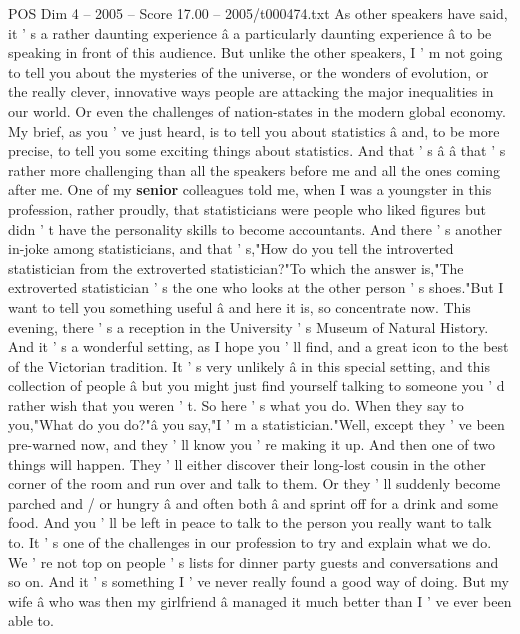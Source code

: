 \begin{textsample}{POS Dim 4 – 2005 – Score 17.00 – 2005/t000474.txt}  \label{ex:f4_pos_017}
As other speakers have said, it ' s a rather daunting experience â a particularly daunting experience â to be speaking in front of this audience.
But unlike the other speakers, I ' m not going to tell you about the mysteries of the universe, or the wonders of evolution, or the really clever, innovative ways people are attacking the major inequalities in our world.
Or even the challenges of nation-states in the modern global economy.
My brief, as you ' ve just heard, is to tell you about statistics â and, to be more precise, to tell you some exciting things about statistics.
And that ' s â â that ' s rather more challenging than all the speakers before me and all the ones coming after me.
One of my \textbf{senior} colleagues told me, when I was a youngster in this profession, rather proudly, that statisticians were people who liked figures but didn ' t have the personality skills to become accountants.
And there ' s another in-joke among statisticians, and that ' s,"How do you tell the introverted statistician from the extroverted statistician?"To which the answer is,"The extroverted statistician ' s the one who looks at the other person ' s shoes."But I want to tell you something useful â and here it is, so concentrate now.
This evening, there ' s a reception in the University ' s Museum of Natural History.
And it ' s a wonderful setting, as I hope you ' ll find, and a great icon to the best of the Victorian tradition.
It ' s very unlikely â in this special setting, and this collection of people â but you might just find yourself talking to someone you ' d rather wish that you weren ' t.
So here ' s what you do.
When they say to you,"What do you do?"â you say,"I ' m a statistician."Well, except they ' ve been pre-warned now, and they ' ll know you ' re making it up.
And then one of two things will happen.
They ' ll either discover their long-lost cousin in the other corner of the room and run over and talk to them.
Or they ' ll suddenly become parched and / or hungry â and often both â and sprint off for a drink and some food.
And you ' ll be left in peace to talk to the person you really want to talk to.
It ' s one of the challenges in our profession to try and explain what we do.
We ' re not top on people ' s lists for dinner party guests and conversations and so on.
And it ' s something I ' ve never really found a good way of doing.
But my wife â who was then my girlfriend â managed it much better than I ' ve ever been able to.

\end{textsample}
